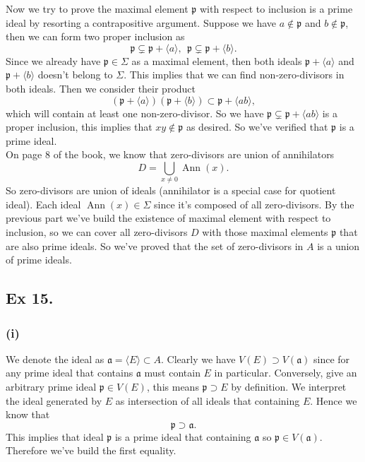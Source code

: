 Now we try to prove the maximal element $\mathfrak p$ with respect to inclusion is a prime ideal by resorting a contrapositive argument.
Suppose we have $a\notin \mathfrak p$ and $b\notin\mathfrak p$, then we can form two proper inclusion as
$$\mathfrak p\subsetneq \mathfrak p+\langle a\rangle,~~ \mathfrak p\subsetneq \mathfrak p+\langle b\rangle.$$
Since we already have $\mathfrak p\in\Sigma$ as a maximal element, then both ideals $\mathfrak p+\langle a\rangle$ and $\mathfrak p+\langle b\rangle$ doesn't belong to $\Sigma$. This implies that we can find non-zero-divisors in both ideals. Then we consider their product
$$(\mathfrak p+\langle a\rangle)(\mathfrak p+\langle b\rangle)\subset \mathfrak p+\langle ab\rangle,$$ which will contain at least one non-zero-divisor. So we have $\mathfrak p\subsetneq\mathfrak p+\langle ab\rangle$ is a proper inclusion, this implies that $xy\notin \mathfrak p$ as desired. So we've verified that $\mathfrak p$ is a prime ideal.\\

On page 8 of the book, we know that zero-divisors are union of annihilators 
$$D=\bigcup_{x\neq 0} \operatorname{Ann}(x).$$ So zero-divisors are union of ideals (annihilator is a special case for quotient ideal). Each ideal $\operatorname{Ann}(x)\in \Sigma$ since it's composed of all zero-divisors. By the previous part we've build the existence of maximal element with respect to inclusion, so we can cover all zero-divisors $D$ with those maximal elements $\mathfrak p$ that are also prime ideals. So we've proved that the set of zero-divisors in $A$ is a union of prime ideals.



\subsection{Ex 15.}

\subsubsection{(i)}

We denote the ideal as $\mathfrak a=\langle E\rangle \subset A$.
Clearly we have $V(E)\supset V(\mathfrak a)$ since for any prime ideal that contains $\mathfrak a$ must contain $E$ in particular. Conversely, give an arbitrary prime ideal $\mathfrak p\in V(E)$, this means $\mathfrak p\supset E$ by definition. We interpret the ideal generated by $E$ as intersection of all ideals that containing $E$. Hence we know that 
$$\mathfrak p\supset \mathfrak a.$$ This implies that ideal $\mathfrak p$ is a prime ideal that containing $\mathfrak a$ so $\mathfrak p\in V(\mathfrak a)$. Therefore we've build the first equality.\\

